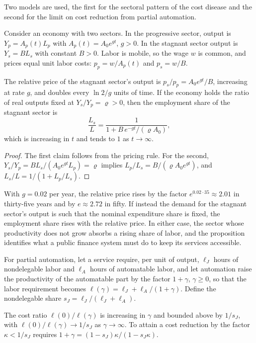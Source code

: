 Two models are used, the first for the sectoral pattern of the cost disease and the second for the limit on cost reduction from partial automation.

Consider an economy with two sectors. In the progressive sector, output is $Y_p=A_p(t)L_p$ with $A_p(t)=A_0e^{gt}$, $g>0$. In the stagnant sector output is $Y_s=BL_s$ with constant $B>0$. Labor is mobile, so the wage $w$ is common, and prices equal unit labor costs: $p_p=w/A_p(t)$ and $p_s=w/B$.

\begin{proposition}
The relative price of the stagnant sector's output is $p_s/p_p=A_0e^{gt}/B$, increasing at rate $g$, and doubles every $\ln2/g$ units of time. If the economy holds the ratio of real outputs fixed at $Y_s/Y_p=\varrho>0$, then the employment share of the stagnant sector is
\[
\frac{L_s}{L}=\frac{1}{1+B\,e^{-gt}/(\varrho A_0)},
\]
which is increasing in $t$ and tends to $1$ as $t\to\infty$.
\end{proposition}

\begin{proof}
The first claim follows from the pricing rule. For the second, $Y_s/Y_p=BL_s/(A_0e^{gt}L_p)=\varrho$ implies $L_p/L_s=B/(\varrho A_0e^{gt})$, and $L_s/L=1/(1+L_p/L_s)$.
\end{proof}

With $g=0.02$ per year, the relative price rises by the factor $e^{0.02\cdot35}\approx2.01$ in thirty-five years and by $e\approx2.72$ in fifty. If instead the demand for the stagnant sector's output is such that the nominal expenditure share is fixed, the employment share rises with the relative price. In either case, the sector whose productivity does not grow absorbs a rising share of labor, and the proposition identifies what a public finance system must do to keep its services accessible.

For partial automation, let a service require, per unit of output, $\ell_J$ hours of nondelegable labor and $\ell_A$ hours of automatable labor, and let automation raise the productivity of the automatable part by the factor $1+\gamma$, $\gamma\ge0$, so that the labor requirement becomes $\ell(\gamma)=\ell_J+\ell_A/(1+\gamma)$. Define the nondelegable share $s_J=\ell_J/(\ell_J+\ell_A)$.

\begin{proposition}
The cost ratio $\ell(0)/\ell(\gamma)$ is increasing in $\gamma$ and bounded above by $1/s_J$, with $\ell(0)/\ell(\gamma)\to1/s_J$ as $\gamma\to\infty$. To attain a cost reduction by the factor $\kappa<1/s_J$ requires $1+\gamma=(1-s_J)\kappa/(1-s_J\kappa)$.
\end{proposition}

